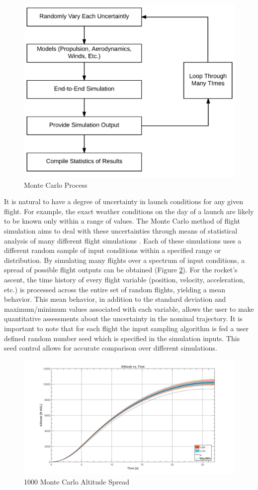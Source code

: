 \documentclass[10pt,a4paper]{article}
\begin{document}
\begin{figure}[H]
	\centering
	\includegraphics[width=.6\textwidth]{./figs/monte_carlo_process.png}
	\caption{Monte Carlo Process}
	\label{fig:monte_carlo_process}
\end{figure}
It is natural to have a degree of uncertainty in launch conditions for any given flight. For example, the exact weather conditions on the day of a launch are likely to be known only within a range of values. The Monte Carlo method of flight simulation aims to deal with these uncertainties through means of statistical analysis of many different flight simulations \cite{monte_carlo}. Each of these simulations uses a different random sample of input conditions within a specified range or distribution. By simulating many flights over a spectrum of input conditions, a spread of possible flight outputs can be obtained (Figure \ref{fig:flight_spread}). For the rocket's ascent, the time history of every flight variable (position, velocity, acceleration, etc.) is processed across the entire set of random flights, yielding a mean behavior. This mean behavior, in addition to the standard deviation and maximum/minimum values associated with each variable, allows the user to make quantitative assessments about the uncertainty in the nominal trajectory. It is important to note that for each flight the input sampling algorithm is fed a user defined random number seed which is specified in the simulation inputs. This seed control allows for accurate comparison over different simulations. 

\begin{figure}[H]
	\centering
	\includegraphics[width=.9\textwidth]{./figs/flight_spread.png}
	\caption{1000 Monte Carlo Altitude Spread}
	\label{fig:flight_spread}
\end{figure}
\end{document}
